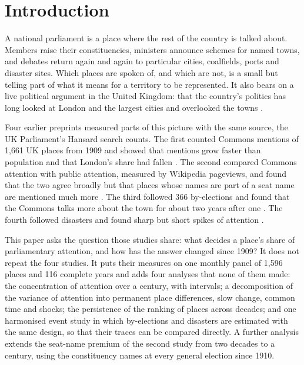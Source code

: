 \documentclass[11pt,a4paper]{article}
\begin{document}
\section{Introduction}
A national parliament is a place where the rest of the country is talked about. Members raise their constituencies, ministers announce schemes for named towns, and debates return again and again to particular cities, coalfields, ports and disaster sites. Which places are spoken of, and which are not, is a small but telling part of what it means for a territory to be represented. It also bears on a live political argument in the United Kingdom: that the country's politics has long looked at London and the largest cities and overlooked the towns \citep{mccann2020,rodriguezpose2018,jenningsstoker2016}.

Four earlier preprints measured parts of this picture with the same source, the UK Parliament's Hansard search counts. The first counted Commons mentions of 1,661 UK places from 1909 and showed that mentions grow faster than population and that London's share had fallen \citep{hotham2026a}. The second compared Commons attention with public attention, measured by Wikipedia pageviews, and found that the two agree broadly but that places whose names are part of a seat name are mentioned much more \citep{hotham2026b}. The third followed 366 by-elections and found that the Commons talks more about the town for about two years after one \citep{hotham2026c}. The fourth followed disasters and found sharp but short spikes of attention \citep{hotham2026d}.

This paper asks the question those studies share: what decides a place's share of parliamentary attention, and how has the answer changed since 1909? It does not repeat the four studies. It puts their measures on one monthly panel of 1,596 places and 116 complete years and adds four analyses that none of them made: the concentration of attention over a century, with intervals; a decomposition of the variance of attention into permanent place differences, slow change, common time and shocks; the persistence of the ranking of places across decades; and one harmonised event study in which by-elections and disasters are estimated with the same design, so that their traces can be compared directly. A further analysis extends the seat-name premium of the second study from two decades to a century, using the constituency names at every general election since 1910.
\end{document}
